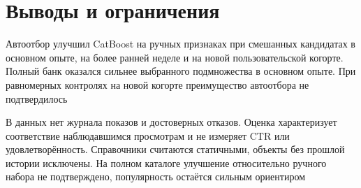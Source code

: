 \FloatBarrier
\section{Выводы и ограничения}

Автоотбор улучшил CatBoost на ручных признаках при смешанных кандидатах
в основном опыте, на более ранней неделе и на новой пользовательской когорте.
Полный банк оказался сильнее выбранного подмножества в основном опыте.
При равномерных контролях на новой когорте преимущество автоотбора
не подтвердилось

В данных нет журнала показов и достоверных отказов.
Оценка характеризует соответствие наблюдавшимся просмотрам
и не измеряет CTR или удовлетворённость.
Справочники считаются статичными, объекты без прошлой истории исключены.
На полном каталоге улучшение относительно ручного набора не подтверждено,
популярность остаётся сильным ориентиром
